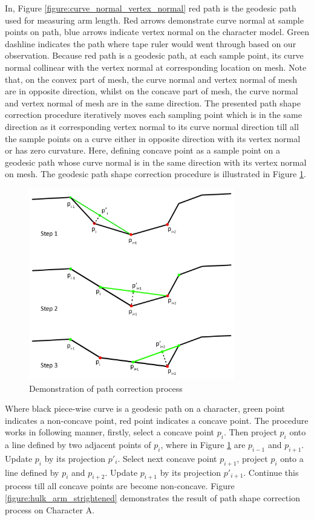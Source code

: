 In, Figure \ref{figure:curve_normal_vertex_normal} red path is the geodesic path used for measuring arm length. Red arrows demonstrate curve normal at sample points on path, blue arrows indicate vertex normal on the character model. Green dashline indicates the path where tape ruler would went through based on our observation. Because red path is a geodesic path, at each sample point, its curve normal collinear with the vertex normal at corresponding location on mesh. Note that, on the convex part of mesh, the curve normal and vertex normal of mesh are in opposite direction, whilst on the concave part of mesh, the curve normal and vertex normal of mesh are in the same direction. The presented path shape correction procedure iteratively moves each sampling point which is in the same direction as it corresponding vertex normal to its curve normal direction till all the sample points on a curve either in opposite direction with its vertex normal or has zero curvature. Here, defining concave point as a sample point on a geodesic path whose curve normal is in the same direction with its vertex normal on mesh. The geodesic path shape correction procedure is illustrated in Figure \ref{figure:straighten}.

\begin{figure}[H]
	\centering
	\includegraphics[width=0.8\textwidth]{../images/geodesic_image/straighten}
	\caption{Demonstration of path correction process}
	\label{figure:straighten}
\end{figure}

Where black piece-wise curve is a geodesic path on a character, green point indicates a non-concave point, red point indicates a concave point. The procedure works in following manner, firstly, select a concave point $p_{i}$. Then project $p_{i}$ onto a line defined by two adjacent points of $p_{i}$, where in Figure \ref{figure:straighten} are $p_{i-1}$ and $p_{i+1}$. Update $p_{i}$ by its projection $p'_{i}$. Select next concave point $p_{i+1}$, project $p_{i}$ onto a line defined by $p_{i}$ and $p_{i+2}$. Update $p_{i+1}$ by its projection  $p'_{i+1}$. Continue this process till all concave points are become non-concave. Figure \ref{figure:hulk_arm_strightened} demonstrates the result of path shape correction process on Character A.


